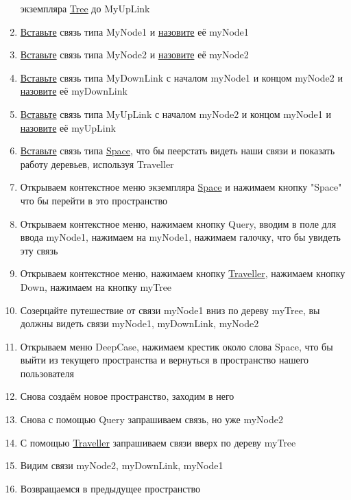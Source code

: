 \begin{enumerate}
            экземпляра \hyperlink{Core.Tree.Description}{Tree} до MyUpLink
      \item \hyperlink{DeepCase.InsertLink.Description}{Вставьте} связь типа
            MyNode1
            и \hyperlink{FAQ.HowToSetName}{назовите} её myNode1
      \item \hyperlink{DeepCase.InsertLink.Description}{Вставьте} связь типа
            MyNode2
            и \hyperlink{FAQ.HowToSetName}{назовите} её myNode2
      \item \hyperlink{DeepCase.InsertLink.Description}{Вставьте} связь типа
            MyDownLink с началом myNode1 и концом myNode2 и
            \hyperlink{FAQ.HowToSetName}{назовите} её myDownLink
      \item \hyperlink{DeepCase.InsertLink.Description}{Вставьте} связь типа
            MyUpLink с началом myNode2 и концом myNode1 и
            \hyperlink{FAQ.HowToSetName}{назовите} её myUpLink
      \item \hyperlink{DeepCase.InsertLink.Description}{Вставьте} связь типа
            \hyperlink{Core.Space.Description}{Space}, что бы пеерстать видеть
            наши
            связи и показать
            работу деревьев, используя Traveller
      \item Открываем контекстное меню экземпляра
            \hyperlink{Core.Space.Description}{Space} и
            нажимаем кнопку "Space" что бы перейти в это пространство
      \item Открываем контекстное меню, нажимаем кнопку Query, вводим в поле
            для
            ввода myNode1, нажимаем на myNode1, нажимаем галочку, что бы
            увидеть
            эту связь
      \item Открываем контекстное меню, нажимаем кнопку
            \hyperlink{Traveller.Description}{Traveller}, нажимаем кнопку Down,
            нажимаем на
            кнопку
            myTree
      \item Созерцайте путешествие от связи myNode1 вниз по дереву myTree, вы
            должны видеть связи myNode1, myDownLink, myNode2
      \item Открываем меню DeepCase, нажимаем крестик около слова Space, что бы
            выйти из текущего пространства и вернуться в пространство нашего
            пользователя
      \item Снова создаём новое пространство, заходим в него
      \item Снова с помощью Query запрашиваем связь, но уже myNode2
      \item С помощью \hyperlink{Traveller.Description}{Traveller} запрашиваем
            связи вверх
            по дереву myTree
      \item Видим связи myNode2, myDownLink, myNode1
      \item Возвращаемся в предыдущее пространство
\end{enumerate}
